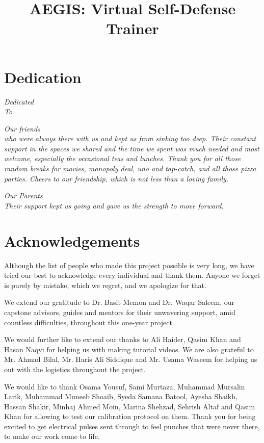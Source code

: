 \documentclass[12pt,twosided]{report}
\title{AEGIS: Virtual Self-Defense Trainer}
\begin{document}

\chapter*{Dedication}

\begin{center}
    \textit{\LARGE Dedicated} \\ \bigskip
    \textit{\Large To}

    \bigskip

    \textit{\large Our friends} \\
    \textit{who were always there with us and kept us from sinking too deep. Their constant support in the spaces we shared and the time we spent was much needed and most welcome, especially the occasional teas and lunches. Thank you for all those random breaks for movies, monopoly deal, uno and tap-catch, and all those pizza parties. Cheers to our friendship, which is not less than a loving family.}

    \bigskip

    \textit{\large Our Parents} \\
    \textit{Their support kept us going and gave us the strength to move forward.}
\end{center}


\chapter*{Acknowledgements}
Although the list of people who made this project possible is very long, we have tried our best to acknowledge every individual and thank them. Anyone we forget is purely by mistake, which we regret, and we apologize for that.

We extend our gratitude to Dr. Basit Memon and Dr. Waqar Saleem, our capstone advisors, guides and mentors for their unwavering support, amid countless difficulties, throughout this one-year project. 

We would further like to extend our thanks to Ali Haider, Qasim Khan and Hasan Naqvi for helping us with making tutorial videos. We are also grateful to Mr. Ahmad Bilal, Mr. Haris Ali Siddique and Mr. Usama Waseem for helping us out with the logistics throughout the project.

We would like to thank Osama Yousuf, Sami Murtaza, Muhammad Mursalin Larik, Muhammad Muneeb Shoaib, Syeda Samana Batool, Ayesha Shaikh,  Hassan Shakir, Minhaj Ahmed Moin, Marina Shehzad, Sehrish Altaf and Qasim Khan for allowing to test our calibration protocol on them. Thank you for being excited to get electrical pulses sent through to feel punches that were never there, to make our work come to life.
\end{document}
